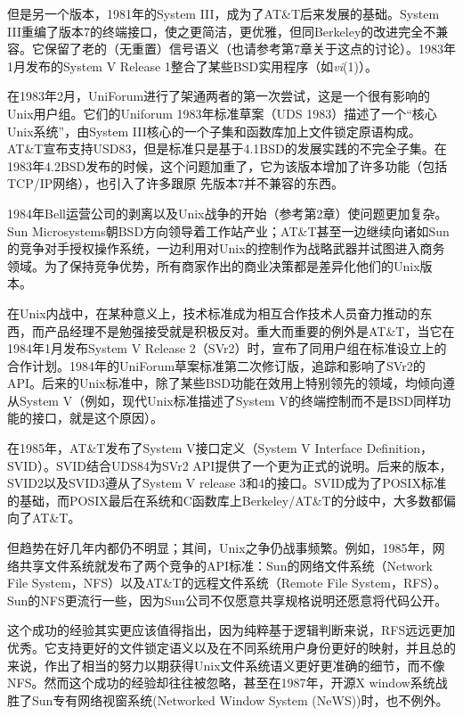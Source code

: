 \documentclass[12pt,oneside]{book}
\begin{document}
但是另一个版本，1981年的System III，成为了AT\&{}T后来发展的基础。System III重编了版本7的终端接口，使之更简洁，更优雅，但同Berkeley的改进完全不兼容。它保留了老的（无重置）信号语义（也请参考第7章关于这点的讨论）。1983年1月发布的System V Release 1整合了某些BSD实用程序（如\textit{vi}(1)）。

在1983年2月，UniForum进行了架通两者的第一次尝试，这是一个很有影响的Unix用户组。它们的Uniforum 1983年标准草案（UDS 1983）描述了一个“核心Unix系统”，由System III核心的一个子集和函数库加上文件锁定原语构成。AT\&{}T宣布支持USD83，但是标准只是基于4.1BSD的发展实践的不完全子集。在1983年4.2BSD发布的时候，这个问题加重了，它为该版本增加了许多功能（包括TCP/IP网络），也引入了许多跟原
先版本7并不兼容的东西。

1984年Bell运营公司的剥离以及Unix战争的开始（参考第2章）使问题更加复杂。Sun Microsystems朝BSD方向领导着工作站产业；AT\&{}T甚至一边继续向诸如Sun的竞争对手授权操作系统，一边利用对Unix的控制作为战略武器并试图进入商务领域。为了保持竞争优势，所有商家作出的商业决策都是差异化他们的Unix版本。

在Unix内战中，在某种意义上，技术标准成为相互合作技术人员奋力推动的东西，而产品经理不是勉强接受就是积极反对。重大而重要的例外是AT\&{}T，当它在1984年1月发布System V Release 2（SVr2）时，宣布了同用户组在标准设立上的合作计划。1984年的UniForum草案标准第二次修订版，追踪和影响了SVr2的API。后来的Unix标准中，除了某些BSD功能在效用上特别领先的领域，均倾向遵从System V（例如，现代Unix标准描述了System V的终端控制而不是BSD同样功能的接口，就是这个原因）。

在1985年，AT\&{}T发布了System V接口定义（System V Interface Definition，SVID）。SVID结合UDS84为SVr2 API提供了一个更为正式的说明。后来的版本，SVID2以及SVID3遵从了System V release 3和4的接口。SVID成为了POSIX标准的基础，而POSIX最后在系统和C函数库上Berkeley/AT\&{}T的分歧中，大多数都偏向了AT\&{}T。

但趋势在好几年内都仍不明显；其间，Unix之争仍战事频繁。例如，1985年，网络共享文件系统就发布了两个竞争的API标准：Sun的网络文件系统（Network File System，NFS）以及AT\&{}T的远程文件系统（Remote File System，RFS）。Sun的NFS更流行一些，因为Sun公司不仅愿意共享规格说明还愿意将代码公开。

这个成功的经验其实更应该值得指出，因为纯粹基于逻辑判断来说，RFS远远更加优秀。它支持更好的文件锁定语义以及在不同系统用户身份更好的映射，并且总的来说，作出了相当的努力以期获得Unix文件系统语义更好更准确的细节，而不像NFS。然而这个成功的经验却往往被忽略，甚至在1987年，开源X window系统战胜了Sun专有网络视窗系统(Networked Window System (NeWS))时，也不例外。
\end{document}
